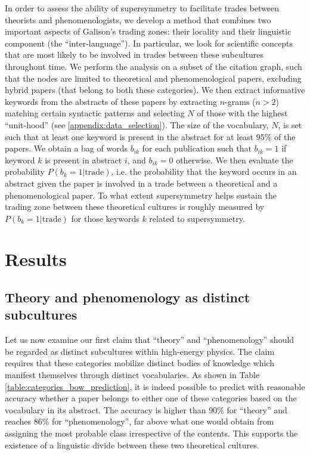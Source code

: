 \documentclass[smallextended]{svjour3}
\begin{document}
In order to assess the ability of supersymmetry to facilitate trades between theorists and phenomenologists, we develop a method that combines two important aspects of Galison's trading zones: their locality and their linguistic component (the ``inter-language''). In particular, we look for scientific concepts that are most likely to be involved in trades between these subcultures throughout time. We perform the analysis on a subset of the citation graph, such that the nodes are limited to theoretical and phenomenological papers, excluding hybrid papers (that belong to both these categories). We then extract informative keywords from the abstracts of these papers by extracting $n$-grams ($n>2$) matching certain syntactic patterns and selecting $N$ of those with the highest ``unit-hood'' (see \ref{appendix:data_selection}). The size of the vocabulary, $N$, is set such that at least one keyword is present in the abstract for at least 95\% of the papers. We obtain a bag of words $b_{ik}$ for each publication such that $b_{ik}=1$ if keyword $k$ is present in abstract $i$, and $b_{ik}=0$ otherwise. We then evaluate the probability $P(b_k=1|\text{trade})$, i.e. the probability that the keyword occurs in an abstract given the paper is involved in a trade between a theoretical and a phenomenological paper. To what extent supersymmetry helps sustain the trading zone between these theoretical cultures is roughly measured by $P(b_k=1|\text{trade})$ for those keywords $k$ related to supersymmetry.

\section{Results}
\label{section:application}

\subsection{Theory and phenomenology as distinct subcultures}\label{section:application_subcultures}

Let us now examine our first claim that ``theory'' and ``phenomenology''  should be regarded as distinct subcultures within high-energy physics. The claim requires that these categories mobilize distinct bodies of knowledge which manifest themselves through distinct vocabularies. As shown in Table \ref{table:categories_bow_prediction}, it is indeed possible to predict with reasonable accuracy whether a paper belongs to either one of these categories based on the vocabulary in its abstract. The accuracy is higher than 90\% for ``theory'' and reaches 86\% for ``phenomenology'', far above what one would obtain from assigning the most probable class irrespective of the contents. This supports the existence of a linguistic divide between these two theoretical cultures.
\end{document}

